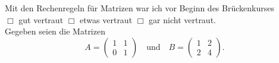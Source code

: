 \documentclass[12pt]{exam}
\begin{document}
\begin{questions}


Mit den Rechenregeln für Matrizen war ich vor Beginn des Brückenkurses\\ $\Box$ gut vertraut \hfill $\Box$ etwas vertraut \hfill $\Box$ gar nicht vertraut. \\[2ex]
Gegeben seien die Matrizen
\[
A=\left(\begin{array}{rr}1&1\\0&1\end{array}\right)
\textrm{~~~und~~~}
B=\left(\begin{array}{rr}1&2\\2&4\end{array}\right).
\]


\end{questions}
\end{document}
